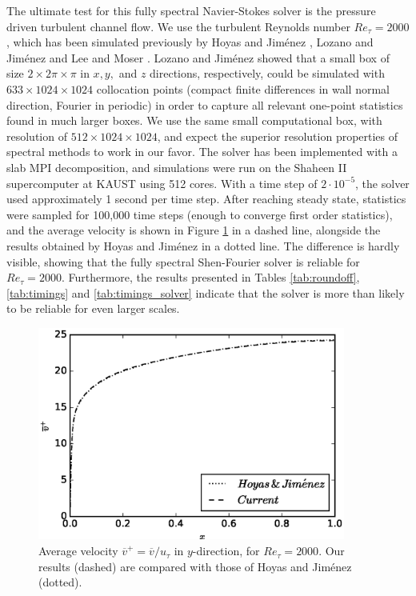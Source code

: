 \documentclass[preprint]{elsarticle}
\newcommand{\D}[1]{\overline{#1}}
\begin{document}
The ultimate test for this fully spectral Navier-Stokes solver is the pressure driven turbulent channel flow.  We use the turbulent Reynolds number $Re_{\tau}=2000$, which has been simulated previously by Hoyas and Jim\'{e}nez \cite{hoyas06}, Lozano and Jim\'{e}nez \cite{Lozano2014} and Lee and Moser \cite{leemoser15}. Lozano and Jim\'{e}nez showed that a small box  of size $2 \times 2\pi \times \pi$ in $x, y,$ and $z$ directions, respectively, could be simulated with $633 \times 1024 \times 1024$ collocation points (compact finite differences in wall normal direction, Fourier in periodic) in order to capture all relevant one-point statistics found in much larger boxes. We use the same small computational box, with resolution of $512 \times 1024 \times 1024$, and expect the superior resolution properties of spectral methods to work in our favor. The solver has been implemented with a slab MPI decomposition, and simulations were run on the Shaheen II supercomputer at KAUST using 512 cores. With a time step of $2\cdot10^{-5}$, the solver used approximately 1 second per time step. After reaching steady state, statistics were sampled for 100,000 time steps (enough to converge first order statistics), and the average velocity is shown in Figure \ref{fig:U_mean} in a dashed line, alongside the results obtained by Hoyas and Jim\'{e}nez \cite{hoyas06} in a dotted line. The difference is hardly visible, showing that the fully spectral Shen-Fourier solver is reliable for $Re_{\tau} = 2000$. Furthermore, the results presented in Tables \ref{tab:roundoff}, \ref{tab:timings} and \ref{tab:timings_solver} indicate that the solver is more than likely to be reliable for even larger scales.

\begin{figure}[t]
	\begin{center}
	\includegraphics[width=0.9\textwidth]{U_Re2000.eps}
	\caption{Average velocity $\D{v}^+ = \D{v}/u_{\tau}$ in $y$-direction, for $Re_{\tau}=2000$. Our results (dashed) are compared with those of Hoyas and Jim\'{e}nez \cite{hoyas06} (dotted).}
	\label{fig:U_mean}
	\end{center}
\end{figure}
\end{document}
